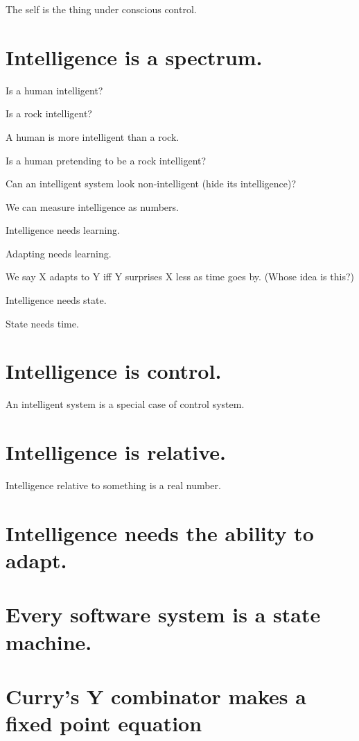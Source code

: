 The self is the thing under conscious control.

\section{Intelligence is a spectrum.}

Is a human intelligent?

Is a rock intelligent?

A human is more intelligent than a rock.

Is a human pretending to be a rock intelligent?

Can an intelligent system look non-intelligent (hide its intelligence)?

We can measure intelligence as numbers.

Intelligence needs learning.

Adapting needs learning.

We say X adapts to Y iff Y surprises X less as time goes by. (Whose idea is this?)

Intelligence needs state.

State needs time.

\section{Intelligence is control.}

An intelligent system is a special case of control system.

\section{Intelligence is relative.}

Intelligence relative to something is a real number.

\section{Intelligence needs the ability to adapt.}

\section{Every software system is a state machine.}

\section{Curry's Y combinator makes a fixed point equation}

